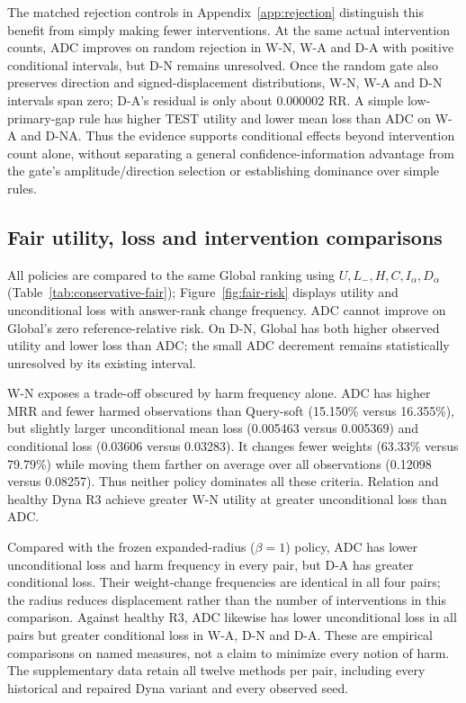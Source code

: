 \documentclass[11pt,a4paper]{article}
\begin{document}
The matched rejection controls in Appendix~\ref{app:rejection} distinguish this benefit from simply making fewer interventions. At the same actual intervention counts, ADC improves on random rejection in W-N, W-A and D-A with positive conditional intervals, but D-N remains unresolved. Once the random gate also preserves direction and signed-displacement distributions, W-N, W-A and D-N intervals span zero; D-A's residual is only about $0.000002$ RR. A simple low-primary-gap rule has higher TEST utility and lower mean loss than ADC on W-A and D-NA. Thus the evidence supports conditional effects beyond intervention count alone, without separating a general confidence-information advantage from the gate's amplitude/direction selection or establishing dominance over simple rules.

\subsection{Fair utility, loss and intervention comparisons}
\label{sec:fair-risk}
All policies are compared to the same Global ranking using $U,L_-,H,C,I_\alpha,D_\alpha$ (Table~\ref{tab:conservative-fair}); Figure~\ref{fig:fair-risk} displays utility and unconditional loss with answer-rank change frequency. ADC cannot improve on Global's zero reference-relative risk. On D-N, Global has both higher observed utility and lower loss than ADC; the small ADC decrement remains statistically unresolved by its existing interval.

W-N exposes a trade-off obscured by harm frequency alone. ADC has higher MRR and fewer harmed observations than Query-soft (15.150\% versus 16.355\%), but slightly larger unconditional mean loss (0.005463 versus 0.005369) and conditional loss (0.03606 versus 0.03283). It changes fewer weights (63.33\% versus 79.79\%) while moving them farther on average over all observations (0.12098 versus 0.08257). Thus neither policy dominates all these criteria. Relation and healthy Dyna R3 achieve greater W-N utility at greater unconditional loss than ADC.

Compared with the frozen expanded-radius ($\beta=1$) policy, ADC has lower unconditional loss and harm frequency in every pair, but D-A has greater conditional loss. Their weight-change frequencies are identical in all four pairs; the radius reduces displacement rather than the number of interventions in this comparison. Against healthy R3, ADC likewise has lower unconditional loss in all pairs but greater conditional loss in W-A, D-N and D-A. These are empirical comparisons on named measures, not a claim to minimize every notion of harm. The supplementary data retain all twelve methods per pair, including every historical and repaired Dyna variant and every observed seed.
\end{document}
